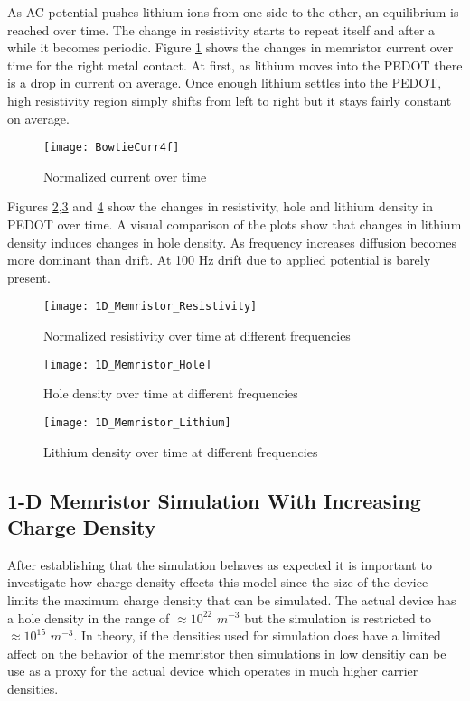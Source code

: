 \begin{doublespace}
As AC potential pushes lithium ions from one side to the other, an equilibrium is reached over time. The change in resistivity starts to repeat itself and after a while it becomes  periodic. Figure \ref{BowtieCurr} shows the changes in memristor current over time for the right metal contact. At first, as lithium moves into the PEDOT there is a drop in current on average. Once enough lithium settles into the PEDOT, high resistivity region simply shifts from left to right but it stays fairly constant on average. 

\begin{figure}[!htp]
\centering
\texttt{[image: BowtieCurr4f]}
\caption{Normalized current over time} 
\label{BowtieCurr}
\end{figure}

Figures \ref{BowtieRes},\ref{Bowhole} and \ref{Bowli} show the changes in resistivity, hole and lithium density in PEDOT over time. A visual comparison of the plots show that changes in lithium density induces changes in hole density. As frequency increases diffusion becomes more dominant than drift. At 100 Hz drift due to applied potential is barely present. 

\begin{figure}[!htp]
\centering
\texttt{[image: 1D\_Memristor\_Resistivity]}
\caption{Normalized resistivity over time at different frequencies} 
\label{BowtieRes}
\end{figure}

\begin{figure}[!htp]
\centering
\texttt{[image: 1D\_Memristor\_Hole]}
\caption{Hole density over time at different frequencies} 
\label{Bowhole}
\end{figure}



\begin{figure}[!htp]
\centering
\texttt{[image: 1D\_Memristor\_Lithium]}
\caption{Lithium density over time at different frequencies} 
\label{Bowli}
\end{figure}




\clearpage
\subsection{1-D Memristor Simulation With Increasing Charge Density}

After establishing that the simulation behaves as expected it is important to investigate how charge density effects this model since the size of the device limits the maximum charge density that can be simulated. The actual device has a hole density in the range of $ \approx 10^{22}$ $m^{-3}$ but the simulation is restricted to $\approx 10^{15}$ $m^{-3}$. In theory, if the densities used for simulation does have a limited affect on the behavior of the memristor then simulations in low densitiy can be use as a proxy for the actual device which operates in much higher carrier densities.


\end{doublespace}
